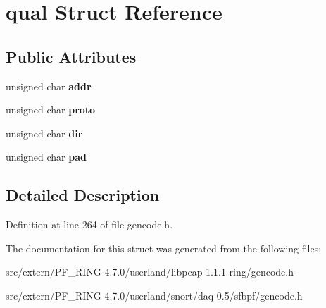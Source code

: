\hypertarget{structqual}{
\section{qual Struct Reference}
\label{structqual}
}
\subsection*{Public Attributes}
\begin{DoxyCompactItemize}
\item 
\hypertarget{structqual_a30d5c69ac0ed6cf4c4e846c3a4bef1e3}{
unsigned char {\bfseries addr}}
\label{structqual_a30d5c69ac0ed6cf4c4e846c3a4bef1e3}

\item 
\hypertarget{structqual_a626c8127ba2129ccccc63da2164998f3}{
unsigned char {\bfseries proto}}
\label{structqual_a626c8127ba2129ccccc63da2164998f3}

\item 
\hypertarget{structqual_a2a585438bcd201925fafb2c759dd8d6d}{
unsigned char {\bfseries dir}}
\label{structqual_a2a585438bcd201925fafb2c759dd8d6d}

\item 
\hypertarget{structqual_a8d8d4aa72e08b993142e1213e1693330}{
unsigned char {\bfseries pad}}
\label{structqual_a8d8d4aa72e08b993142e1213e1693330}

\end{DoxyCompactItemize}


\subsection{Detailed Description}


Definition at line 264 of file gencode.h.



The documentation for this struct was generated from the following files:\begin{DoxyCompactItemize}
\item 
src/extern/PF\_\-RING-\/4.7.0/userland/libpcap-\/1.1.1-\/ring/gencode.h\item 
src/extern/PF\_\-RING-\/4.7.0/userland/snort/daq-\/0.5/sfbpf/gencode.h\end{DoxyCompactItemize}
